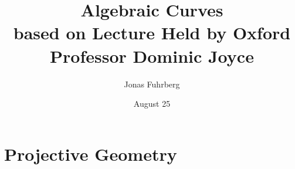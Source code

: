 \documentclass[12pt]{article}
\title{Algebraic Curves \\ \large based on Lecture Held by Oxford Professor Dominic Joyce}
\author{Jonas Fuhrberg}
\date{August 25}
\begin{document}
\maketitle
\newpage

\section{Projective Geometry}

    

    
\end{document}
